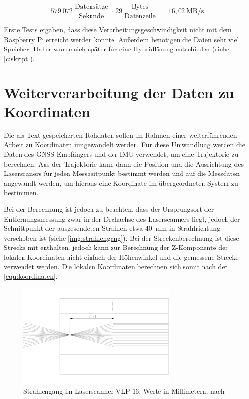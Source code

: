 \documentclass[a4paper,12pt,bibliography=totoc, listof=totoc,titlepage,pointlessnumbers]{scrreprt}
\begin{document}
\begin{equation}
579~072~\frac{\text{Datens\"{a}tze}}{\text{Sekunde}}~\cdot~29~\frac{\text{Bytes}}{\text{Datenzeile}}~=~16,02~\text{MB/s}
\label{equ:Datenrate}
\end{equation}

Erste Tests ergaben, dass diese Verarbeitungsgeschwindigkeit nicht mit dem Rasp\-berry Pi erreicht werden konnte. Außerdem benötigen die Daten sehr viel Speicher. Daher wurde sich später für eine Hybridlösung entschieden (siehe \autoref{c:skript}).

\section{Weiterverarbeitung der Daten zu Koordinaten}
Die als Text gespeicherten Rohdaten sollen im Rahmen einer weiterführenden Arbeit zu Koordinaten umgewandelt werden. Für diese Umwandlung werden die Daten des GNSS-Empfängers und der IMU verwendet, um eine Trajektorie zu berechnen. Aus der Trajektorie kann dann die Position und die Ausrichtung des Laser\-scan\-ers für jeden Messzeitpunkt bestimmt werden und auf die Messdaten angewandt werden, um hieraus eine Koordinate im übergeordneten System zu bestimmen.

Bei der Berechnung ist jedoch zu beachten, dass der Ursprungsort der Entfernungsmessung zwar in der Drehachse des Laser\-scan\-ners liegt, jedoch der Schnittpunkt der ausgesendeten Strahlen etwa 40~mm in Strahlrichtung verschoben ist (siehe \autoref{img:strahlengang}). Bei der Streckenberechnung ist diese Strecke mit enthalten, jedoch kann zur Berechnung der Z-Komponente der lokalen Koordinaten nicht einfach der Höhenwinkel und die gemessene Strecke verwendet werden. Die lokalen Koordinaten berechnen sich somit nach der \autoref{equ:koordinaten}.

\begin{figure}[!ht]
 \centering
 \includegraphics[width=0.7\textwidth]{./img/Strahlengang.png}
 \caption{Strahlengang im Laser\-scan\-ner VLP-16, Werte in Millimetern, nach 
\citet{vlpCAD}}
 \label{img:strahlengang}
\end{figure}
\end{document}
